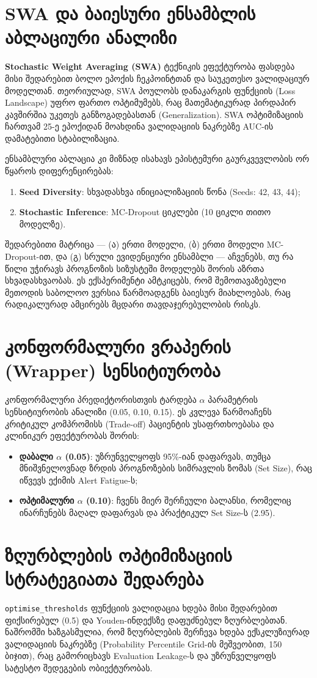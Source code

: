 \documentclass[12pt,a4paper,oneside]{report}
\begin{document}
\section{SWA და ბაიესური ენსამბლის აბლაციური ანალიზი}
\textbf{Stochastic Weight Averaging (SWA)} ტექნიკის ეფექტურობა ფასდება მისი შედარებით ბოლო ეპოქის ჩეკპოინტთან და საუკეთესო ვალიდაციურ მოდელთან. თეორიულად, SWA პოულობს დანაკარგის ფუნქციის (Loss Landscape) უფრო ფართო ოპტიმუმებს, რაც მათემატიკურად პირდაპირ კავშირშია უკეთეს განზოგადებასთან (Generalization). SWA ოპტიმიზაციის ჩართვამ 25-ე ეპოქიდან მოახდინა ვალიდაციის ნაკრებზე AUC-ის დამატებითი სტაბილიზაცია.

ენსამბლური აბლაცია კი მიზნად ისახავს ეპისტემური გაურკვევლობის ორ წყაროს დიფერენცირებას:
\begin{enumerate}[leftmargin=1.6em]
    \item \textbf{Seed Diversity}: სხვადასხვა ინიციალიზაციის წონა (Seeds: 42, 43, 44);
    \item \textbf{Stochastic Inference}: MC-Dropout ციკლები (10 ციკლი თითო მოდელზე).
\end{enumerate}
შედარებითი მატრიცა — (ა) ერთი მოდელი, (ბ) ერთი მოდელი MC-Dropout-ით, და (გ) სრული ევიდენციური ენსამბლი — აჩვენებს, თუ რა წილი უჭირავს პროგნოზის სიზუსტეში მოდელებს შორის აზრთა სხვადასხვაობას. ეს ექსპერიმენტი ამტკიცებს, რომ შემოთავაზებული მეთოდის საბოლოო ვერსია წარმოადგენს ბაიესურ მიახლოებას, რაც რადიკალურად ამცირებს მცდარი თავდაჯერებულობის რისკს.

\section{კონფორმალური ვრაპერის (Wrapper) სენსიტიურობა}
კონფორმალური პრედიქტორისთვის ტარდება $\alpha$ პარამეტრის სენსიტიურობის ანალიზი (0.05, 0.10, 0.15). ეს კვლევა წარმოაჩენს კრიტიკულ კომპრომისს (Trade-off) პაციენტის უსაფრთხოებასა და კლინიკურ ეფექტურობას შორის:
\begin{itemize}
    \item \textbf{დაბალი $\alpha$ (0.05)}: უზრუნველყოფს 95\%-იან დაფარვას, თუმცა მნიშვნელოვნად ზრდის პროგნოზების სიმრავლის ზომას (Set Size), რაც იწვევს ექიმის Alert Fatigue-ს;
    \item \textbf{ოპტიმალური $\alpha$ (0.10)}: ჩვენს მიერ შერჩეული ბალანსი, რომელიც ინარჩუნებს მაღალ დაფარვას და პრაქტიკულ Set Size-ს (2.95).
\end{itemize}

\section{ზღურბლების ოპტიმიზაციის სტრატეგიათა შედარება}
\texttt{optimise\_thresholds} ფუნქციის ვალიდაცია ხდება მისი შედარებით ფიქსირებულ (0.5) და Youden-ინდექსზე დაფუძნებულ ზღურბლებთან. ნაშრომში ხაზგასმულია, რომ ზღურბლების შერჩევა ხდება ექსკლუზიურად ვალიდაციის ნაკრებზე (Probability Percentile Grid-ის მეშვეობით, 150 ბიჯით), რაც გამორიცხავს Evaluation Leakage-ს და უზრუნველყოფს სატესტო შედეგების ობიექტურობას.
\end{document}
